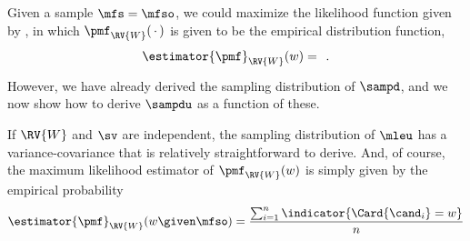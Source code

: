 \documentclass[../main.tex]{subfiles}
\begin{document}
Given a sample $\mfs = \mfso$, we could maximize the likelihood function given by \Cref{}, in which $\pmf_{\RV{W}}(\,\cdot\,)$ is given to be the empirical distribution function,
\begin{equation}
    \estimator{\pmf}_{\RV{W}}(w) = \frac{}{}\,.
\end{equation}
However, we have already derived the sampling distribution of $\sampd$, and we now show how to derive $\sampdu$ as a function of these.




If $\RV{W}$ and $\sv$ are independent, the sampling distribution of $\mleu$ has a variance-covariance that is relatively straightforward to derive. And, of course, the maximum likelihood estimator of $\pmf_{\RV{W}}(w)$ is simply given by the empirical probability
\begin{equation}
    \estimator{\pmf}_{\RV{W}}(w \given \mfso) =
    \frac { \sum_{i=1}^{n} \indicator{\Card{\cand_i} = w}}
    { n }
\end{equation}
\end{document}
